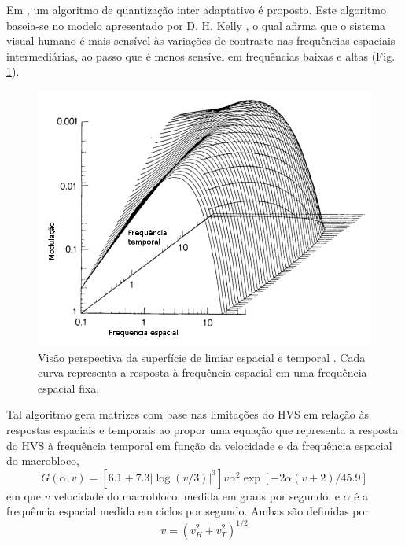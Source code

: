 Em \cite{Li_humanvisual}, um algoritmo de quantização inter adaptativo é proposto. Este algoritmo baseia-se no modelo apresentado por D. H. Kelly \cite{Kelly1979}, o qual afirma que o sistema visual humano é mais sensível às variações de contraste nas frequências espaciais intermediárias, ao passo que é menos sensível em frequências baixas e altas (Fig. \ref{fig:threshold_surface}). 
\begin{figure}[!ht]
\begin{center}
\includegraphics[scale=0.4]{./Figures/png/spatialtemporal_threshold.png}
\caption{Visão perspectiva da superfície de limiar espacial e temporal \cite{Kelly1979}. Cada curva representa a resposta à frequência espacial em uma frequência espacial fixa.}
\label{fig:threshold_surface}
\end{center}
\end{figure}
Tal algoritmo gera matrizes com base nas limitações do HVS em relação às respostas espaciais e temporais ao propor uma equação que representa a resposta do HVS à frequência temporal em função da velocidade e da frequência espacial do macrobloco,
\begin{equation}
G(\alpha,v) = \left[ 6.1 + 7.3 |\log(v/3)|^3 \right] v \alpha^2 \exp \left[ -2 \alpha (v+2)/45.9 \right]
\end{equation}
em que $ v $ velocidade do macrobloco, medida em graus por segundo, e $ \alpha $ é a frequência espacial medida em ciclos por segundo. Ambas são definidas por
\begin{equation}
v = (v_H^2 + v_T^2)^{1/2} 
\end{equation}
